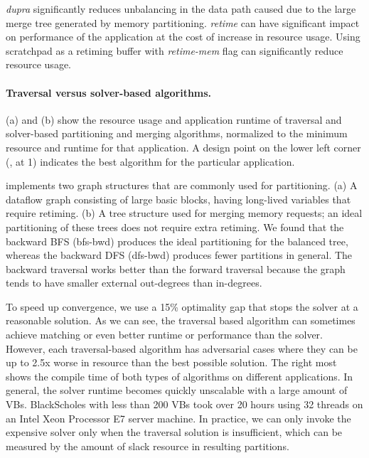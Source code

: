 \emph{dupra} significantly reduces unbalancing in the data path caused due to the large merge tree generated by memory partitioning.
\emph{retime} can have significant impact on performance of the application at the cost of increase in resource usage.
Using scratchpad as a retiming buffer with \emph{retime-mem} flag can significantly reduce resource usage.

\paragraph{Traversal versus solver-based algorithms.}
 (a) and (b) show the resource usage and application runtime of traversal and solver-based partitioning and merging algorithms, normalized to the minimum resource and runtime for that application.
A design point on the lower left corner (\ie, at 1) indicates the best algorithm for the particular application.

\name{} implements two graph structures that are commonly used for partitioning.
(a) A dataflow graph consisting of large basic blocks, having long-lived variables that require retiming.
(b) A tree structure used for merging memory requests; an ideal partitioning of these trees does not require extra retiming.
We found that the backward BFS (bfs-bwd) produces the ideal partitioning for the balanced tree, whereas the backward DFS (dfs-bwd) produces fewer partitions in general.
The backward traversal works better than the forward traversal because the graph tends to have smaller external out-degrees than in-degrees.

To speed up convergence, we use a 15\% optimality gap that stops the solver at a reasonable solution.
As we can see, the traversal based algorithm can sometimes achieve matching or even better runtime or performance than the solver.
However, each traversal-based algorithm has adversarial cases where they can be up to 2.5x worse in resource than the best possible solution.
The right most  shows the compile time of both types of algorithms on different applications.
In general, the solver runtime becomes quickly unscalable with a large amount of VBs.
BlackScholes with less than 200 VBs took over 20 hours using 32 threads on an Intel Xeon Processor E7 server machine.
In practice, we can only invoke the expensive solver only when the traversal solution is insufficient, which can be
measured by the amount of slack resource in resulting partitions.

